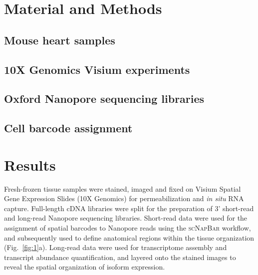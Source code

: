 \documentclass[utf8]{FrontiersinHarvard} %
\newcommand{\insi}{\textit{in situ}\xspace}
\newcommand{\scn}{\textsc{scNapBar}\xspace}
\begin{document}



\section*{Material and Methods}


\subsection*{Mouse heart samples}


\subsection*{10X Genomics Visium experiments}


\subsection*{Oxford Nanopore sequencing libraries}


\subsection*{Cell barcode assignment}



\section*{Results}
Fresh-frozen tissue samples were stained, imaged and fixed on Visium Spatial Gene Expression Slides (10X Genomics) for permeabilization and \insi RNA capture.
Full-length cDNA libraries were split for the preparation of 3' short-read and long-read Nanopore sequencing libraries.
Short-read data were used for the assignment of spatial barcodes to Nanopore reads using the \scn workflow, and subsequently used to define anatomical regions within the tissue organization (Fig.~\ref{fig:1}a).
Long-read data were used for transcriptome assembly and transcript abundance quantification, and layered onto the stained images to reveal the spatial organization of isoform expression.


\end{document}
